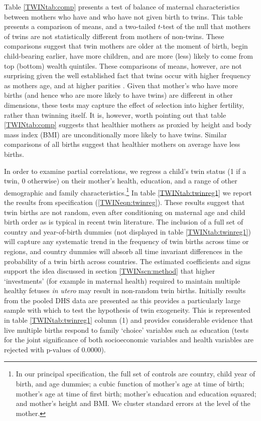 Table \ref{TWINtab:comp} presents a test of balance of maternal characteristics
between mothers who have and who have not given birth to twins.  This table
presents a comparison of means, and a two-tailed $t$-test of the null that 
mothers of twins are not statistically different from mothers of non-twins.
These comparisons suggest that twin mothers are older at the moment of birth,
begin child-bearing earlier, have more children, and are more (less) likely to
come from top (bottom) wealth quintiles.  These comparisons of means, however,
are not surprising given the well established fact that twins occur with higher
frequency as mothers age, and at higher parities \citep{Hall2003}. Given that
mother's who have more births (and hence who are more likely to have twins) are
different in other dimensions, these tests may capture the effect of selection
into higher fertility, rather than twinning itself.  It is, however, worth 
pointing out that table \ref{TWINtab:comp} suggests that healthier mothers as
proxied by height and body mass index (BMI) are unconditionally more likely to 
have twins.  Similar comparisons of all births suggest that healthier mothers
on average have less births.

In order to examine partial correlations, we regress a child's twin status
(1 if a twin, 0 otherwise) on their mother's health, education, and a range
of other demographic and family characteristics.\footnote{In our principal
specification, the full set of controls are country, child year of birth, and
age dummies; a cubic function of mother's age at time of birth; mother's age
at time of first birth; mother's education and education squared; and mother's
height and BMI.  We cluster standard errors at the level of the mother.}  In 
table \ref{TWINtab:twinreg1} we report the results from specification 
(\ref{TWINeqn:twinreg}). These results suggest that twin births are not random, 
even after conditioning on maternal age and child birth order as is typical in 
recent twin literature. The inclusion of a full set of country and year-of-birth 
dummies (not displayed in table \ref{TWINtab:twinreg1}) will capture any 
systematic trend in the frequency of twin births across time or regions, and 
country dummies will absorb all time invariant differences in the probability 
of a twin birth across countries.  The estimated coefficients and signs support 
the idea discussed in section \ref{TWINscn:method} that higher `investments' 
(for example in maternal health) required to maintain multiple healthy fetuses 
\emph{in utero} may result in non-random twin births. Initially results from the 
pooled DHS data are presented as this provides a particularly large sample with 
which to test the hypothesis of twin exogeneity.  This is represented in table 
\ref{TWINtab:twinreg1} column (1) and provides considerable evidence that live 
multiple births respond to family `choice' variables such as education (tests 
for the joint significance of both socioeconomic variables and health variables 
are rejected with p-values of 0.0000).

